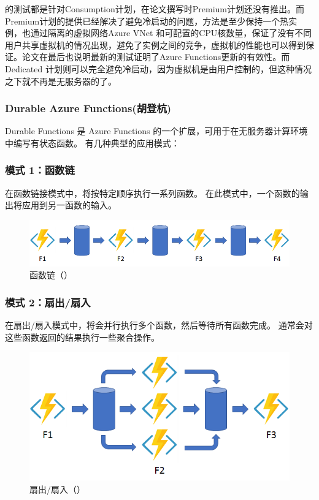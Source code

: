 \documentclass[11pt]{article}
\begin{document}
\cite{wang2018peeking}的测试都是针对Consumption计划，在论文撰写时Premium计划还没有推出。而Premium计划的提供已经解决了避免冷启动的问题，方法是至少保持一个热实例，也通过隔离的虚拟网络Azure VNet 和可配置的CPU核数量，保证了没有不同用户共享虚拟机的情况出现，避免了实例之间的竞争，虚拟机的性能也可以得到保证。论文在最后也说明最新的测试证明了Azure Functions更新的有效性。而Dedicated 计划则可以完全避免冷启动，因为虚拟机是由用户控制的，但这种情况之下就不再是无服务器的了。
\subsubsection{Durable Azure Functions(胡登杭)}
Durable Functions 是 Azure Functions 的一个扩展，可用于在无服务器计算环境中编写有状态函数。  
有几种典型的应用模式：
\subsubsection{模式 1：函数链}
在函数链接模式中，将按特定顺序执行一系列函数。 在此模式中，一个函数的输出将应用到另一函数的输入。
\begin{figure}[H]
\begin{flushleft}
\includegraphics[width=\textwidth]{figs/model1}
\caption{函数链（\cite{Durable}）}
\end{flushleft}
\end{figure}

\subsubsection{模式 2：扇出/扇入}
在扇出/扇入模式中，将会并行执行多个函数，然后等待所有函数完成。 通常会对这些函数返回的结果执行一些聚合操作。
\begin{figure}[H]
\begin{flushleft}
\includegraphics[width=\textwidth]{figs/model2}
\caption{扇出/扇入（\cite{Durable}）}
\end{flushleft}
\end{figure}
\end{document}
